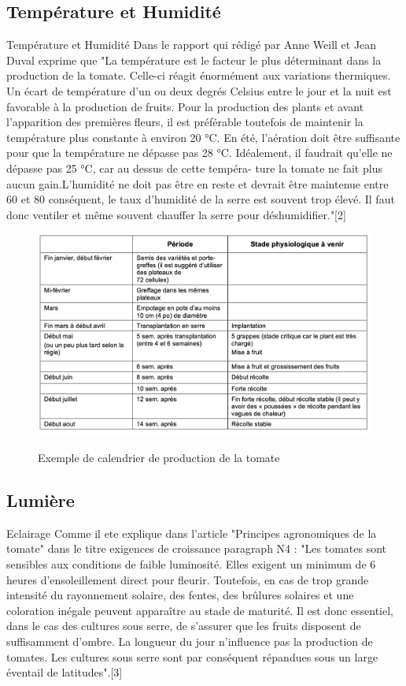 \subsection{Température et Humidité}
Température et Humidité
Dans le rapport qui rédigé par Anne Weill et Jean Duval exprime que
"La température est le facteur le plus déterminant dans la production de la tomate. Celle-ci
réagit énormément aux variations thermiques.
Un écart de température d’un ou deux degrés Celsius entre le jour et la nuit est favorable à
la production de fruits. Pour la production des plants et avant l’apparition des premières
fleurs, il est préférable toutefois de maintenir la température plus constante à environ
20 °C. En été, l’aération doit être suffisante pour que la température ne dépasse pas 28
°C. Idéalement, il faudrait qu’elle ne dépasse pas 25 °C, car au dessus de cette tempéra-
ture la tomate ne fait plus aucun gain.L’humidité ne doit pas être en reste et devrait être
maintenue entre 60 et 80 %
conséquent, le taux d’humidité de la serre est souvent trop élevé. Il faut donc ventiler et
même souvent chauffer la serre pour déshumidifier."[2]
\begin{figure}
    \centering
    \centering
    \caption{Exemple de calendrier de production de la tomate}
	\includegraphics[width=15cm]{figures/periodetomate.png}
	\label{fig:Exemple de calendrier de production de la tomate} 
\end{figure}

\subsection{Lumière}
Eclairage
Comme il ete explique dans l’article "Principes agronomiques de la tomate" dans le titre
exigences de croissance paragraph N4 : "Les tomates sont sensibles aux conditions de
faible luminosité. Elles exigent un minimum de 6 heures d’ensoleillement direct pour
fleurir. Toutefois, en cas de trop grande intensité du rayonnement solaire, des fentes, des
brûlures solaires et une coloration inégale peuvent apparaître au stade de maturité. Il est
donc essentiel, dans le cas des cultures sous serre, de s’assurer que les fruits disposent de
suffisamment d’ombre. La longueur du jour n’influence pas la production de tomates. Les
cultures sous serre sont par conséquent répandues sous un large éventail de latitudes".[3]
